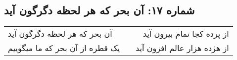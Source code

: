 \begin{center}
\section*{شماره ۱۷: آن بحر که هر لحظه دگرگون آید}
\label{sec:017}
\begin{longtable}{l p{0.5cm} r}
آن بحر که هر لحظه دگرگون آید
&&
از پرده کجا تمام بیرون آید
\\
یک قطره از آن بحر که ما میگوییم
&&
از هژده هزار عالم افزون آید
\\
\end{longtable}
\end{center}
